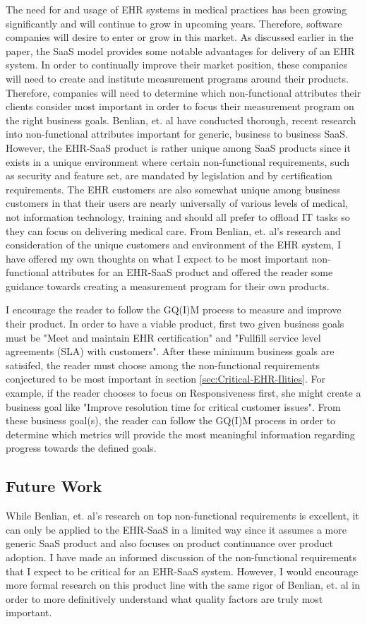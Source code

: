 \documentclass[10pt]{article}
\begin{document}
The need for and usage of EHR systems in medical practices has been growing significantly and will continue to grow in upcoming years.
Therefore, software companies will desire to enter or grow in this market.
As discussed earlier in the paper, the SaaS model provides some notable advantages for delivery of an EHR system.
In order to continually improve their market position, these companies will need to create and institute measurement programs around their products.
Therefore, companies will need to determine which non-functional attributes their clients consider most important in order to focus their measurement program on the right business goals.
Benlian, et. al have conducted thorough, recent research into non-functional attributes important for generic, business to business SaaS.
However, the EHR-SaaS product is rather unique among SaaS products since it exists in a unique environment where certain non-functional requirements, such as security and feature set, are mandated by legislation and by certification requirements.
The EHR customers are also somewhat unique among business customers in that their users are nearly universally of various levels of medical, not information technology, training and should all prefer to offload IT tasks so they can focus on delivering medical care.
From Benlian, et. al's research and consideration of the unique customers and environment of the EHR system, I have offered my own thoughts on what I expect to be most important non-functional attributes for an EHR-SaaS product and offered the reader some guidance towards creating a measurement program for their own products.

I encourage the reader to follow the GQ(I)M process to measure and improve their product.
In order to have a viable product, first two given business goals must be "Meet and maintain EHR certification" and "Fullfill service level agreements (SLA) with customers".
After these minimum business goals are satisifed, the reader must choose among the non-functional requirements conjectured to be most important in section \ref{sec:Critical-EHR-Ilities}.
For example, if the reader chooses to focus on Responsiveness first, she might create a business goal like "Improve resolution time for critical customer issues".
From these business goal(s), the reader can follow the GQ(I)M process in order to determine which metrics will provide the most meaningful information regarding progress towards the defined goals.

\subsection{Future Work}
While Benlian, et. al's research on top non-functional requirements is excellent, it can only be applied to the EHR-SaaS in a limited way since it assumes a more generic SaaS product and also focuses on product continuance over product adoption.
I have made an informed discussion of the non-functional requirements that I expect to be critical for an EHR-SaaS system.
However, I would encourage more formal research on this product line with the same rigor of Benlian, et. al in order to more definitively understand what quality factors are truly most important.



\end{document}
